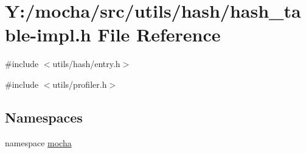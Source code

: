 \hypertarget{hash__table-impl_8h}{
\section{Y:/mocha/src/utils/hash/hash\_\-table-\/impl.h File Reference}
\label{hash__table-impl_8h}
}
{\ttfamily \#include $<$utils/hash/entry.h$>$}\par
{\ttfamily \#include $<$utils/profiler.h$>$}\par
\subsection*{Namespaces}
\begin{DoxyCompactItemize}
\item 
namespace \hyperlink{namespacemocha}{mocha}
\end{DoxyCompactItemize}
